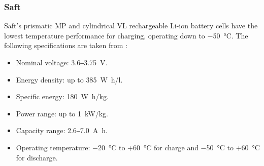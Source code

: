 \subsubsection{Saft}
Saft's prismatic MP and cylindrical VL rechargeable \ac{Li-ion} battery cells have the lowest temperature performance for charging, operating down to \SI{-50}{\celsius}. The following specifications are taken from :

\begin{itemize}
  \item Nominal voltage: 3.6‒\SI{3.75}{\volt}.
  \item Energy density: up to \SI{385}{\watt\hour/l}.
  \item Specific energy: \SI{180}{\watt\hour/\kilo\gram}.
  \item Power range: up to \SI{1}{\kilo\watt/\kilo\gram}.
  \item Capacity range: 2.6‒\SI{7.0}{\ampere\hour}.
  \item Operating temperature: \SI{-20}{\celsius} to +\SI{60}{\celsius} for charge and \SI{-50}{\celsius} to +\SI{60}{\celsius} for discharge.
\end{itemize}
